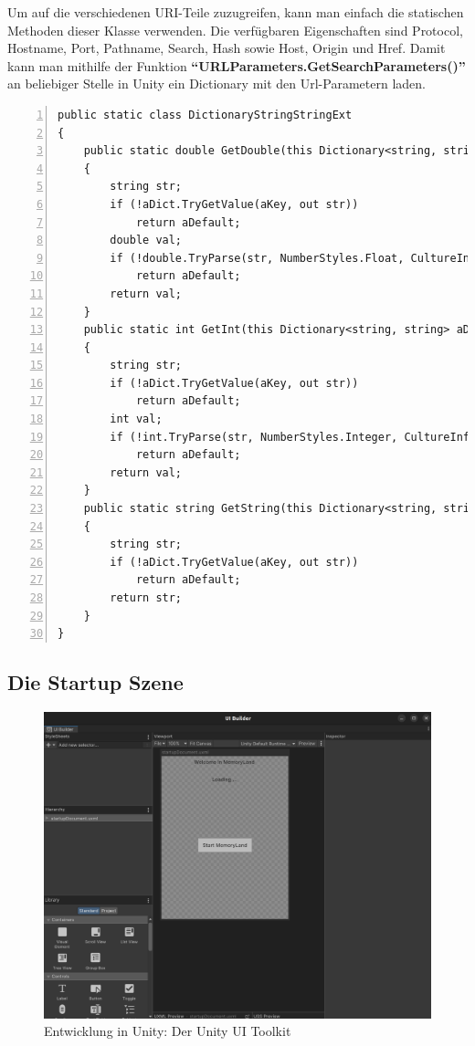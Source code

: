 Um auf die verschiedenen URI-Teile zuzugreifen, kann man einfach die statischen Methoden dieser Klasse verwenden. Die verfügbaren Eigenschaften sind Protocol, Hostname, Port, Pathname, Search, Hash sowie Host, Origin und Href. Damit kann man mithilfe der Funktion \textbf{``URLParameters.GetSearchParameters()''} an beliebiger Stelle in Unity ein Dictionary mit den Url-Parametern laden.

\begin{lstlisting}[numbers=left,caption={UrlParameter},label={lst:unity-url-parameter}]
public static class DictionaryStringStringExt
{
    public static double GetDouble(this Dictionary<string, string> aDict, string aKey, double aDefault)
    {
        string str;
        if (!aDict.TryGetValue(aKey, out str))
            return aDefault;
        double val;
        if (!double.TryParse(str, NumberStyles.Float, CultureInfo.InvariantCulture, out val))
            return aDefault;
        return val;
    }
    public static int GetInt(this Dictionary<string, string> aDict, string aKey, int aDefault)
    {
        string str;
        if (!aDict.TryGetValue(aKey, out str))
            return aDefault;
        int val;
        if (!int.TryParse(str, NumberStyles.Integer, CultureInfo.InvariantCulture, out val))
            return aDefault;
        return val;
    }
    public static string GetString(this Dictionary<string, string> aDict, string aKey, string aDefault)
    {
        string str;
        if (!aDict.TryGetValue(aKey, out str))
            return aDefault;
        return str;
    }
}
\end{lstlisting}


\subsection{Die Startup Szene}
\label{subsec:unity-startup-scene}


\begin{figure} [h t]
    \centering
    \includegraphics[scale=0.12]{pics/unity-ui-builder.png}
    \caption{Entwicklung in Unity: Der Unity UI Toolkit}
    \label{fig:unity-ui-builder}
\end{figure}


